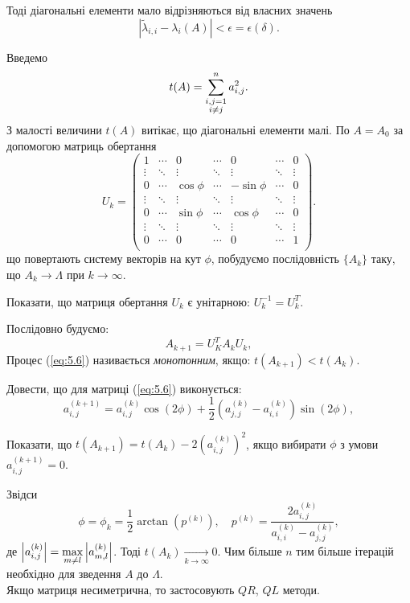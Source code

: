 Тоді діагональні елементи мало відрізняються від власних значень \[ |\tilde \lambda_{i,i} - \lambda_i(A) | < \epsilon = \epsilon(\delta). \]

Введемо 
\[t(A) = \displaystyle\sum\limits_{\substack{i, j = 1 \\ i \ne j}}^n a_{i,j}^2.\]
З малості величини $t(A)$ витікає, що діагональні елементи малі. По $A = A_0$ за допомогою матриць обертання 
\[ U_k = \begin{pmatrix} 1 & \cdots & 0 & \cdots & 0 & \cdots & 0 \\ \vdots & \ddots & \vdots & \ddots & \vdots & \ddots & \vdots \\ 0 & \cdots & \cos \phi & \cdots & -\sin \phi & \cdots & 0 \\ \vdots & \ddots & \vdots & \ddots & \vdots & \ddots & \vdots \\ 0 & \cdots & \sin \phi & \cdots & \cos \phi & \cdots & 0 \\ \vdots & \ddots & \vdots & \ddots & \vdots & \ddots & \vdots \\ 0 & \cdots & 0 & \cdots & 0 & \cdots & 1 \\ \end{pmatrix}. \]
що повертають систему векторів на кут $\phi$, побудуємо послідовність $\{A_k\}$ таку, що $A_k \to \Lambda$ при $k\to\infty$.

\begin{problem}
	Показати, що матриця обертання $U_k$ є унітарною: $U_k^{-1} = U_k^T$.
\end{problem}

Послідовно будуємо:
\begin{equation}
	\label{eq:5.6}
	A_{k+1} = U_K^T A_k U_k,
\end{equation}
Процес (\ref{eq:5.6}) називається \textit{монотонним}, якщо: $t(A_{k+1})<t(A_k)$.

\begin{problem}
Довести, що для матриці (\ref{eq:5.6}) виконується:
\begin{equation}
	\label{eq:5.7}
	a_{i,j}^{(k+1)} = a_{i,j}^{(k)} \cos (2 \phi) + \dfrac12 \left(a_{j,j}^{(k)} - a_{i,i}^{(k)}\right) \sin (2 \phi),
\end{equation}

Показати, що $t(A_{k+1})=t(A_k)-2\left(a_{i,j}^{(k)}\right)^2$, якщо вибирати $\phi$ з умови $a_{i,j}^{(k+1)} = 0$.
\end{problem}

Звідси 
\[\phi = \phi_k = \frac12 \arctan\left(p^{(k)}\right), \quad p^{(k)} = \frac{2a_{i,j}^{(k)}}{a_{i,i}^{(k)}-a_{j,j}^{(k)}},\] де $\left|a_{i,j}^{(k)}\right| = \displaystyle\max\limits_{m \ne l} \left|a_{m,l}^{(k)}\right|$. Тоді
$t(A_k) \xrightarrow[k\to\infty]{} 0$. Чим більше $n$ тим більше ітерацій необхідно для зведення $A$ до $\Lambda$. \\

Якщо матриця несиметрична, то застосовують $QR$, $QL$ методи.